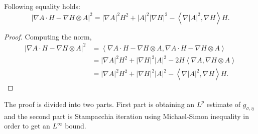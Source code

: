 \begin{comment}
\begin{lemma}
    \begin{equation}
        | H \cdot\nabla_{i} h_{kl}  - \nabla_{i}H\cdot h_{kl}|^{2} = H^{2}| \nabla A|^{2}+ |A|^{2}| \nabla H|^{2}   - \left<  \nabla_{i}|A|^{2}, \nabla_{i}H \right>H
    \end{equation}
\end{lemma}
\begin{proof}
    \begin{align*}
        \left< H \cdot\nabla_{i} h_{kl}  - \nabla_{i}H\cdot h_{kl}, H \cdot\nabla_{i} h_{kl}  - \nabla_{i}H\cdot h_{kl} \right> & = H^{2}| \nabla A|^{2} + 
    \end{align*}
\end{proof} 
\end{comment}

\begin{lemma}
    Following equality holds: 
    \begin{equation}
        |\nabla A \cdot H - \nabla H \otimes A|^{2} = | \nabla A|^{2}H^{2} + |A|^{2}| \nabla H|^{2} - \left<  \nabla |A|^{2}, \nabla H \right>H.
    \end{equation}
\end{lemma}
\begin{proof}
    Computing the norm, 
    \begin{align*}
        |\nabla A \cdot H - \nabla H \otimes A|^{2} & = \left<  \nabla A \cdot H - \nabla H \otimes A, \nabla A \cdot H - \nabla H \otimes A  \right> \\
        & = |\nabla A|^{2}H^{2} + |\nabla H|^{2}|A|^{2} - 2H\left< \nabla A, \nabla H \otimes A \right> \\
        & = |\nabla A|^{2}H^{2} + |\nabla H|^{2}|A|^{2} - \left< \nabla |A|^{2}, \nabla H \right>H.
    \end{align*}
\end{proof}

The proof is divided into two parts. First part is obtaining an $ L^{p} $ estimate of $ g_{ \sigma, \eta} $ and the second part is Stampacchia iteration using Michael-Simon inequality in order to get an $ L^{\infty} $ bound. 

